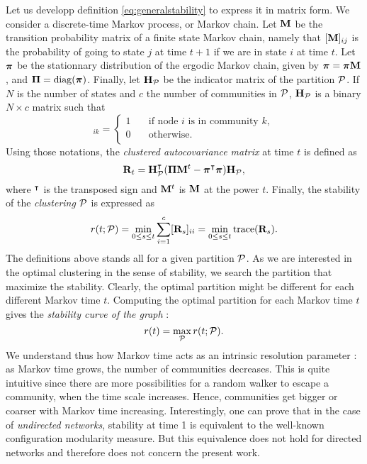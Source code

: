 Let us developp definition \eqref{eq:generalstability} to express it in matrix form. We consider a discrete-time Markov process, or Markov chain. Let $\b M$ be the transition probability matrix of a finite state Markov chain, namely that $[\b M]_{ij}$ is the probability of going to state $j$ at time $t+1$ if we are in state $i$ at time $t$. Let $\bs \pi$ be the stationnary distribution of the ergodic Markov chain, given by $\bs \pi = \bs \pi  \b M$, and $\b \Pi = \rm{diag}(\bs \pi)$. Finally, let $\b H_{\P}$ be the indicator matrix of the partition $\P$. If $N$ is the number of states and $c$ the number of communities in $\P$, $\b H_{\P}$ is a binary $N \times c$ matrix such that 
\begin{equation}
	[\b H_{\P}]_{ik} = 
	\begin{cases}
		1       & \quad \mbox{if node $i$ is in community $k$},\\
	    0  & \quad \text{otherwise}.\\
	\end{cases}
\end{equation}
Using those notations, the \textit{clustered autocovariance matrix} at time $t$ is defined as
\begin{equation}
	\b R_t = \b H_{\P}^{\t}(\b \Pi\b M^t - \bs \pi^{\t}\bs \pi)\b H_{\P},
\end{equation}
where $^\t$ is the transposed sign and $\b M^t$ is $\b M$ at the power $t$. Finally, the stability of the \textit{clustering} $\P$ is expressed as
\begin{equation}
	r(t;\P) = \min_{0 \le s \le t} \sum_{i = 1}^{c} [\b R_s]_{ii} = \min_{0 \le s \le t} \rm{trace}(\b R_s).
\end{equation}
The definitions above stands all for a given partition $\P$. As we are interested in the optimal clustering in the sense of stability, we search the partition that maximize the stability. Clearly, the optimal partition might be different for each different Markov time $t$. Computing the optimal partition for each Markov time $t$ gives the \textit{stability curve of the graph} :
\begin{equation}
	r(t) = \max_{\P} r(t;\P).
\end{equation}
We understand thus how Markov time acts as an intrinsic resolution parameter : as Markov time grows, the number of communities decreases. This is quite intuitive since there are more possibilities for a random walker to escape a community, when the time scale increases. Hence, communities get bigger or coarser with Markov time increasing. Interestingly, one can prove that in the case of \textit{undirected networks}, stability at time 1 is equivalent to the well-known configuration modularity measure. But this equivalence does not hold for directed networks and therefore does not concern the present work.

